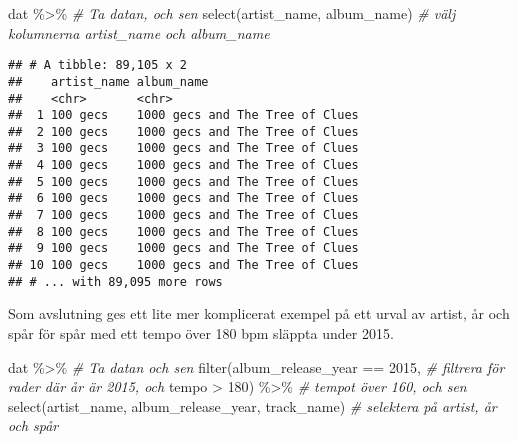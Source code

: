 \documentclass[
]{book}
\newenvironment{Shaded}{\begin{snugshade}}{\end{snugshade}}
\newcommand{\CommentTok}[1]{\textcolor[rgb]{0.56,0.35,0.01}{\textit{#1}}}
\newcommand{\DecValTok}[1]{\textcolor[rgb]{0.00,0.00,0.81}{#1}}
\newcommand{\FunctionTok}[1]{\textcolor[rgb]{0.00,0.00,0.00}{#1}}
\newcommand{\NormalTok}[1]{#1}
\newcommand{\SpecialCharTok}[1]{\textcolor[rgb]{0.00,0.00,0.00}{#1}}
\theoremstyle{definition}
\theoremstyle{definition}
\theoremstyle{definition}
\theoremstyle{definition}
\theoremstyle{remark}
\begin{document}
\begin{Shaded}
\begin{Highlighting}[]
\NormalTok{dat }\SpecialCharTok{\%\textgreater{}\%}                                \CommentTok{\# Ta datan, och sen}
  \FunctionTok{select}\NormalTok{(artist\_name, album\_name)      }\CommentTok{\# välj kolumnerna artist\_name och album\_name}
\end{Highlighting}
\end{Shaded}

\begin{verbatim}
## # A tibble: 89,105 x 2
##    artist_name album_name                     
##    <chr>       <chr>                          
##  1 100 gecs    1000 gecs and The Tree of Clues
##  2 100 gecs    1000 gecs and The Tree of Clues
##  3 100 gecs    1000 gecs and The Tree of Clues
##  4 100 gecs    1000 gecs and The Tree of Clues
##  5 100 gecs    1000 gecs and The Tree of Clues
##  6 100 gecs    1000 gecs and The Tree of Clues
##  7 100 gecs    1000 gecs and The Tree of Clues
##  8 100 gecs    1000 gecs and The Tree of Clues
##  9 100 gecs    1000 gecs and The Tree of Clues
## 10 100 gecs    1000 gecs and The Tree of Clues
## # ... with 89,095 more rows
\end{verbatim}

Som avslutning ges ett lite mer komplicerat exempel på ett urval av artist, år och spår för spår med ett tempo över 180 bpm släppta under 2015.

\begin{Shaded}
\begin{Highlighting}[]
\NormalTok{dat }\SpecialCharTok{\%\textgreater{}\%}                                                    \CommentTok{\# Ta datan och sen}
  \FunctionTok{filter}\NormalTok{(album\_release\_year }\SpecialCharTok{==} \DecValTok{2015}\NormalTok{,                       }\CommentTok{\# filtrera för rader där år är 2015, och }
\NormalTok{         tempo }\SpecialCharTok{\textgreater{}} \DecValTok{180}\NormalTok{) }\SpecialCharTok{\%\textgreater{}\%}                                  \CommentTok{\# tempot över 160, och sen}
  \FunctionTok{select}\NormalTok{(artist\_name, album\_release\_year, track\_name)      }\CommentTok{\# selektera på artist, år och spår}
\end{Highlighting}
\end{Shaded}
\end{document}
